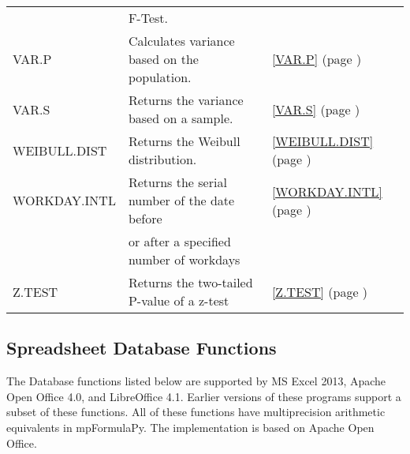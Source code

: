 \begin{center}
\begin{longtable}{l l l }
		& F-Test. &   \\
		VAR.P & Calculates variance based on the population. &  \ref{VAR.P} (page \pageref{VAR.P}) \index{Spreadsheet Functions!VAR.P} \\
		VAR.S & Returns the variance based on a sample. &  \ref{VAR.S} (page \pageref{VAR.S}) \index{Spreadsheet Functions!VAR.S} \\
		WEIBULL.DIST & Returns the Weibull distribution. &  \ref{WEIBULL.DIST} (page \pageref{WEIBULL.DIST}) \index{Spreadsheet Functions!WEIBULL.DIST} \\
		WORKDAY.INTL & Returns the serial number of the date before &  \ref{WORKDAY.INTL} (page \pageref{WORKDAY.INTL}) \index{Spreadsheet Functions!WORKDAY.INTL} \\
		& or after a specified number of workdays &   \\
		Z.TEST & Returns the two-tailed P-value of a z-test &  \ref{Z.TEST} (page \pageref{Z.TEST}) \index{Spreadsheet Functions!Z.TEST} \\
	\end{longtable}
\end{center}





\newpage 
\subsection{Spreadsheet Database Functions}
The Database functions listed below are supported by MS Excel 2013, Apache Open Office 4.0, and LibreOffice 4.1. Earlier versions of these programs support a subset of these functions.
All of these functions have multiprecision arithmetic equivalents in mpFormulaPy. The implementation is based on Apache Open Office. 




